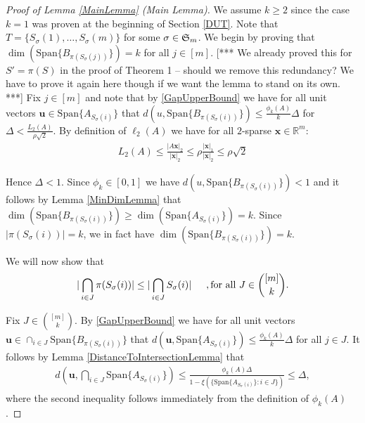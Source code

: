 \documentclass[journal, onecolumn]{IEEEtran}
\begin{document}

\begin{proof}[Proof of Lemma \ref{MainLemma} (Main Lemma)]
We assume $k \geq 2$ since the case $k = 1$ was proven at the beginning of Section \ref{DUT}. Note that $T = \{S_\sigma(1), \ldots, S_\sigma(m)\}$ for some $\sigma \in \frak{S}_m$. We begin by proving that $\dim(\text{Span}\{B_{\pi(S_\sigma(j))}\}) = k$ for all $j \in [m]$. [*** We already proved this for $S' = \pi(S)$ in the proof of Theorem 1 -- should we remove this redundancy? We have to prove it again here though if we want the lemma to stand on its own. ***] Fix $j \in [m]$ and note that by \eqref{GapUpperBound} we have for all unit vectors $\mathbf{u} \in \text{Span}\{A_{S_\sigma(i)}\}$ that $d(u, \text{Span}\{B_{\pi(S_\sigma(i))}\}) \leq \frac{\phi_k(A)}{k} \Delta$ for $\Delta < \frac{L_2(A)}{\rho \sqrt{2}}$. By definition of $\ell_2(A)$ we have for all $2$-sparse $\mathbf{x} \in \mathbb{R}^m$:
\begin{align}
L_2(A) \leq \frac{|A\mathbf{x}|_2}{|\mathbf{x}|_2} \leq \rho \frac{|\mathbf{x}|_1}{|\mathbf{x}|_2} \leq \rho \sqrt{2}
\end{align}

Hence $\Delta < 1$. Since $\phi_k \in [0,1]$ we have $d(u, \text{Span}\{B_{\pi(S_\sigma(i))}\}) < 1$ and it follows by Lemma \ref{MinDimLemma} that $\dim(\text{Span}\{B_{\pi(S_\sigma(i))}\}) \geq \dim(\text{Span}\{A_{S_\sigma(i)}\}) = k$. Since $|\pi(S_\sigma(i))| = k$, we in fact have $\dim(\text{Span}\{B_{\pi(S_\sigma(i))}\}) = k$. %

We will now show that
\begin{align}\label{fact2}
|\bigcap_{i \in J} \pi(S_\sigma(i))| \leq |\bigcap_{i \in J} S_\sigma(i) | \indent, \text{for all} \ J \in {[m] \choose k}.
\end{align}

Fix $J \in {[m] \choose k}$. By \eqref{GapUpperBound} we have for all unit vectors $\mathbf{u} \in \cap_{i \in J} \text{Span}\{B_{\pi(S_\sigma(i))}\}$ that $d(\mathbf{u}, \text{Span}\{A_{S_\sigma(i)}\}) \leq \frac{\phi_k(A)}{k} \Delta$ for all $j \in J$. It follows by Lemma \ref{DistanceToIntersectionLemma} that
\begin{align*}
d\left( \mathbf{u}, \bigcap_{i \in J} \text{Span}\{A_{S_{\sigma}(i)}\} \right) 
\leq \frac{ \phi_k(A) \Delta  }{1 - \xi( \{ \text{Span}\{A_{S_{\sigma}(i)}\}: i \in J\} ) } \leq \Delta,
\end{align*}
%
where the second inequality follows immediately from the definition of $\phi_k(A)$. 


\end{proof}
\end{document}
